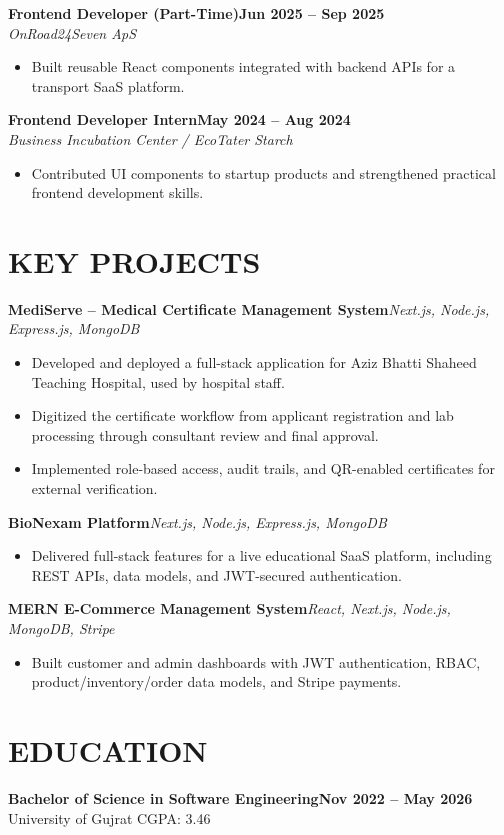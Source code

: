 \documentclass[10pt,a4paper]{article}
\newcommand{\resumeSubheading}[4]{%
  \textbf{#1}\hfill \textbf{#2}\\
  \textit{#3}\hfill \textit{#4}\\[-2pt]
}
\newcommand{\resumeProject}[2]{%
  \textbf{#1}\hfill \textit{#2}\\[-2pt]
}
\begin{document}
\resumeSubheading{Frontend Developer (Part-Time)}{Jun 2025 -- Sep 2025}{OnRoad24Seven ApS}{}
\begin{itemize}
  \item Built reusable React components integrated with backend APIs for a transport SaaS platform.
\end{itemize}

\resumeSubheading{Frontend Developer Intern}{May 2024 -- Aug 2024}{Business Incubation Center / EcoTater Starch}{}
\begin{itemize}
  \item Contributed UI components to startup products and strengthened practical frontend development skills.
\end{itemize}

\section*{KEY PROJECTS}

\resumeProject{MediServe -- Medical Certificate Management System}{Next.js, Node.js, Express.js, MongoDB}
\begin{itemize}
  \item Developed and deployed a full-stack application for Aziz Bhatti Shaheed Teaching Hospital, used by hospital staff.
  \item Digitized the certificate workflow from applicant registration and lab processing through consultant review and final approval.
  \item Implemented role-based access, audit trails, and QR-enabled certificates for external verification.
\end{itemize}

\resumeProject{BioNexam Platform}{Next.js, Node.js, Express.js, MongoDB}
\begin{itemize}
  \item Delivered full-stack features for a live educational SaaS platform, including REST APIs, data models, and JWT-secured authentication.
\end{itemize}

\resumeProject{MERN E-Commerce Management System}{React, Next.js, Node.js, MongoDB, Stripe}
\begin{itemize}
  \item Built customer and admin dashboards with JWT authentication, RBAC, product/inventory/order data models, and Stripe payments.
\end{itemize}

\section*{EDUCATION}
\textbf{Bachelor of Science in Software Engineering}\hfill \textbf{Nov 2022 -- May 2026}\\
University of Gujrat \hfill CGPA: 3.46
\end{document}

